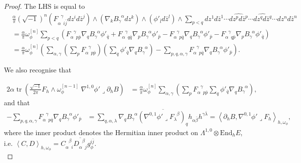 \documentclass[10pt, letterpaper]{amsart}
\newcommand{\tr}{\operatorname{tr}}
\theoremstyle{plain}
\theoremstyle{definition}
\numberwithin{equation}{section}
\begin{document}
\begin{proof}
	The LHS is equal to 
	\begin{align*}
	&\frac{\alpha}{\pi}\left(\sqrt{-1}\right)^n 
	\left( F_{\alpha\phantom{\gamma}i\bar j}^{\phantom{\alpha}\gamma}dz^id\bar z^j\right) \wedge 
	\left(\nabla_k B_\gamma^{\phantom{\gamma}\alpha}dz^k\right)\wedge 
	\left( \phi'_{\bar l}d\bar z^l\right)
	\wedge 
	\sum_{p<q} dz^1d\bar z^1\cdots \widehat{dz^pd\bar z^p}\cdots \widehat{dz^qd\bar z^q}\cdots dz^n d\bar z^n\\
	&
	=
		\frac{\alpha}{\pi}\omega_\phi^{[n]}
\sum_{p<q} 
\left( F_{\alpha\phantom{\gamma}p\bar p}^{\phantom{\alpha}\gamma}\nabla_q B_\gamma^{\phantom{\gamma}\alpha}\phi'_{\bar q}
+ 
F_{\alpha\phantom{\gamma}q\bar q}^{\phantom{\alpha}\gamma}\nabla_p B_\gamma^{\phantom{\gamma}\alpha}\phi'_{\bar p}
- 
F_{\alpha\phantom{\gamma}p\bar q}^{\phantom{\alpha}\gamma}\nabla_q B_\gamma^{\phantom{\gamma}\alpha}\phi'_{\bar p}
- 
F_{\alpha\phantom{\gamma}q\bar p}^{\phantom{\alpha}\gamma}\nabla_p B_\gamma^{\phantom{\gamma}\alpha}\phi'_{\bar q}
\right)\\
& 
= 
\frac{\alpha}{\pi}\omega_\phi^{[n]} 
\left( \sum_{\alpha,\gamma}\left(\sum_p F_{\alpha\phantom{\gamma}p\bar p}^{\phantom{\alpha}\gamma}\right)\left(\sum_q \phi'_{\bar q}\nabla_q B_\gamma^{\phantom{\gamma}\alpha}\right)
- 
\sum_{p,q,\alpha,\gamma} F_{\alpha\phantom{\gamma}p\bar q}^{\phantom{\alpha}\gamma}\nabla_q B_\gamma^{\phantom{\gamma}\alpha}\phi'_{\bar p}\right). 
	\end{align*}
	
	We also recognise that 
	
	\begin{align*}
		2\alpha \tr \left( \frac{\sqrt{-1}}{2\pi} F_h\wedge \omega_\phi^{[n-1]} \; \nabla^{1,0}\phi'\lrcorner \partial_h B\right)
		& = 
		\frac{\alpha}{\pi} \omega_\phi^{[n]} 
		\sum_{\alpha,\gamma}
		\left(
		\sum_p F_{\alpha\phantom{\gamma}p\bar p}^{\phantom{\alpha}\gamma}
		\sum_q \phi'_{\bar q}\nabla_q B_\gamma^{\phantom{\gamma}\alpha}
		\right),
	\end{align*}
	and that
	\begin{align*}
	 -\sum_{p,q,\alpha,\gamma} F_{\alpha\phantom{\gamma}p\bar q}^{\phantom{\alpha}\gamma}\nabla_q B_\gamma^{\phantom{\gamma}\alpha}\phi'_{\bar p}
    & = 
     \sum_{q,\alpha,\lambda} \nabla_q B_\gamma^{\phantom{\gamma}\alpha} 
   \overline{\left( \nabla^{0,1}\phi'\lrcorner F_\lambda^{\phantom{\lambda}\beta}\right)_q}h_{\alpha\bar\beta}h^{\gamma\bar\lambda}
    = 
    \left\langle \partial_h B, \nabla^{0,1}\phi'\lrcorner F_{h}\right\rangle_{h,\omega_\phi},
	\end{align*}
where the inner product denotes the Hermitian inner product on $\Lambda^{1,0}\otimes \text{End}_h E$, i.e. $\left\langle C,D\right\rangle_{h,\omega_\phi}= C_{\alpha\phantom{\beta}i}^{\phantom{\alpha}\beta}\overline{D_{\alpha\phantom{\beta}j}^{\phantom{\alpha}\beta}}g_\phi^{i\bar j}$.	\\


\end{proof}
\end{document}
